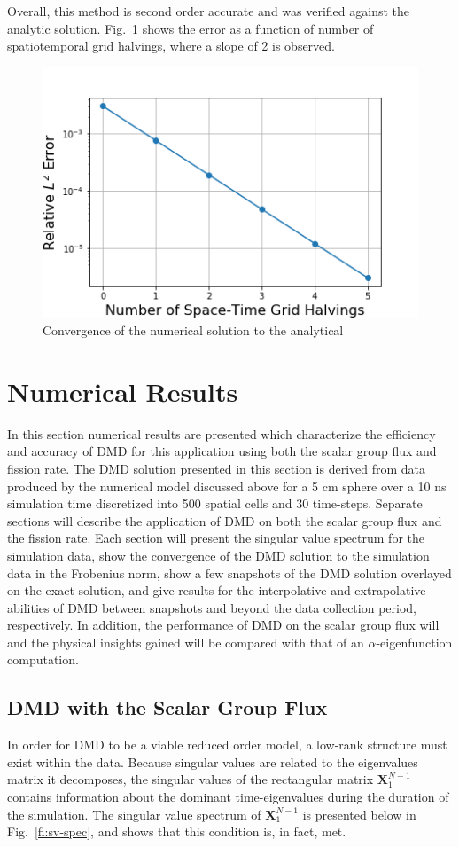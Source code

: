 \documentclass[12pt]{article}
\newcommand{\LFI}[1]{\label{fi:#1}}
\newcommand{\FI}[1]{Fig.~\ref{fi:#1}}
\newcommand{\bfg}{\begin{figure}}
\newcommand{\efg}{\end{figure}}
\begin{document}
Overall, this method is second order accurate and was verified against the 
	analytic solution. 
\FI{2ord} shows the error as a function of number of spatiotemporal grid 
	halvings, where a slope of 2 is observed.

\bfg[h] \centering
	\includegraphics[scale=0.5]{method_convergence.png}
	\caption{Convergence of the numerical solution to the analytical}
	\LFI{2ord}
\efg

\section{Numerical Results}
In this section numerical results are presented which characterize the 
	efficiency and accuracy of DMD for this application using both the scalar 
	group flux and fission rate.
The DMD solution presented in this section is derived from data produced by the 
	numerical model discussed above for a 5 cm sphere over a 10 ns simulation 
	time discretized into 500 spatial cells and 30 time-steps.
Separate sections will describe the application of DMD on both the scalar 
	group flux and the fission rate.
Each section will present the singular value spectrum for the simulation data,
	show the convergence of the DMD solution to the simulation data in the 
	Frobenius norm, show a few snapshots of the DMD solution overlayed on the 
	exact solution, and give results for the interpolative and extrapolative 
	abilities of DMD between snapshots and beyond the data collection period, 
	respectively.
In addition, the performance of DMD on the scalar group flux will and the 
	physical insights gained will be compared with that of an 
	$\alpha$-eigenfunction computation.

\subsection{DMD with the Scalar Group Flux}
In order for DMD to be a viable reduced order model, a low-rank structure must 
	exist within the data.
Because singular values are related to the eigenvalues matrix it decomposes, 
	the singular values of the rectangular matrix $\bm{X}^{N-1}_1$ contains 
	information about the dominant time-eigenvalues during the duration of the 
	simulation.
The singular value spectrum of  $\bm{X}^{N-1}_1$ is presented below in 
	\FI{sv-spec}, and shows that this condition is, in fact, met.
\end{document}
